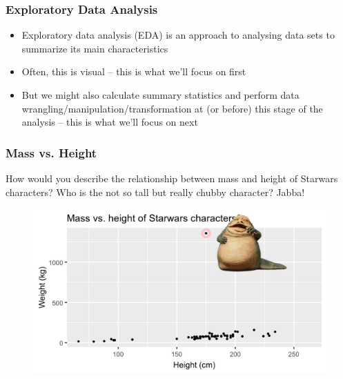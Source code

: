 \documentclass[11pt]{beamer}
\begin{document}
	\begin{frame}
		
		\frametitle{\textbf{Exploratory Data Analysis}}
		
	\begin{itemize}
		\item Exploratory data analysis (EDA) is an approach to analysing data sets to summarize its main characteristics
		\item Often, this is visual -- this is what we'll focus on first
		\item But we might also calculate summary statistics and perform data wrangling/manipulation/transformation at (or before) this stage of the analysis -- this is what we'll focus on next
	\end{itemize}
		
	\end{frame}
		\begin{frame}
		
		\frametitle{\textbf{Mass vs. Height}}\vspace{-.5em}
		How would you describe the relationship between mass and height of Starwars characters? Who is the not so tall but really chubby character? Jabba!
		\vspace{-2em}
\begin{figure}
	\centering
	\includegraphics[width=0.75\linewidth]{Images/S2/jabbaplot}

\end{figure}

		
	\end{frame}
	
\end{document}
